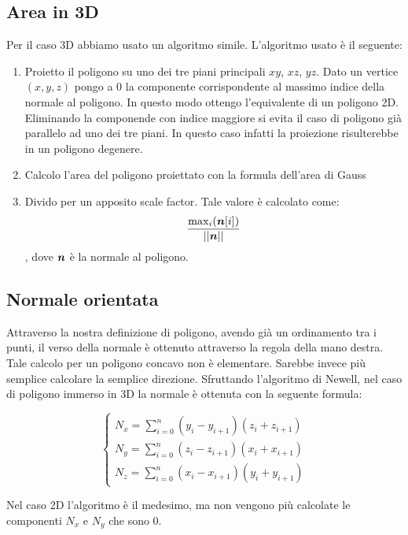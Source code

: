 \documentclass[oneside,12pt]{book}  %
\theoremstyle{plain}
\theoremstyle{definition}
\theoremstyle{remark}
\numberwithin{equation}{chapter} %
\begin{document}

\subsection{Area in 3D}
Per il caso 3D abbiamo usato un algoritmo simile. L'algoritmo usato
\`e il seguente:
\begin{enumerate}
\item Proietto il poligono su uno dei tre piani principali $xy$, $xz$,
  $yz$. 
Dato un vertice $(x,y,z)$ pongo a 0 la componente corrispondente al
massimo indice della normale al poligono. In questo modo ottengo
l'equivalente di un poligono 2D. Eliminando la componende con indice
maggiore si evita il caso di poligono gi\`a parallelo ad uno dei tre
piani. In questo caso infatti la proiezione risulterebbe in un
poligono degenere.

\item Calcolo l'area del poligono proiettato con la formula dell'area
  di Gauss

\item Divido per un apposito scale factor. Tale valore \`e calcolato
  come:
$$ \frac{\max_i ({\mbox{\boldmath$n$}}[i])}{||{\mbox{\boldmath$n$}}||} $$,
dove ${\mbox{\boldmath$n$}}$ \`e la normale al poligono.

\end{enumerate}

\subsection{Normale orientata}
Attraverso la nostra definizione di poligono, avendo gi\`a un
ordinamento tra i punti, il verso della normale
\`e ottenuto attraverso la regola della mano destra.
Tale calcolo per un poligono concavo non \`e
elementare. Sarebbe invece pi\`u semplice calcolare la semplice
direzione.
Sfruttando l'algoritmo di Newell, nel caso di poligono immerso in 3D
la normale \`e ottenuta con la seguente formula:

$$
\begin{cases}
N_x=\sum_{i=0}^{n} (y_i-y_{i+1})(z_i+z_{i+1}) \\
N_y=\sum_{i=0}^{n} (z_i-z_{i+1})(x_i+x_{i+1}) \\
N_z=\sum_{i=0}^{n} (x_i-x_{i+1})(y_i+y_{i+1}) 
\end{cases}
$$

Nel caso 2D l'algoritmo \`e il medesimo, ma non vengono pi\`u
calcolate le componenti $N_x$ e $N_y$ che sono 0.
\end{document}
